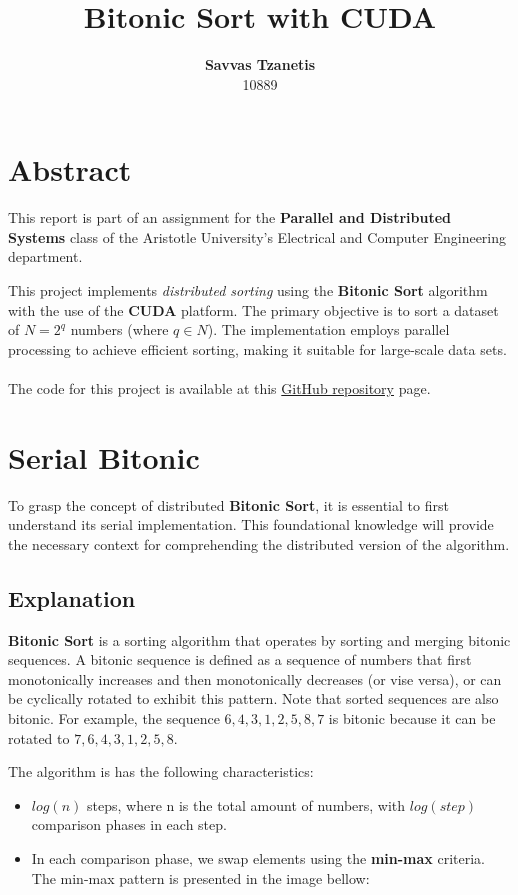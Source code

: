 \documentclass[12pt]{report}
\begin{document}
\title{\textbf{Bitonic Sort with CUDA}}
\author{\textbf{Savvas Tzanetis} \\ 10889}
\maketitle

\tableofcontents

\chapter{Abstract}
This report is part of an assignment for the \textbf{Parallel and Distributed Systems} class of the
Aristotle University's Electrical and Computer Engineering department. 

This project implements \textit{distributed sorting} using the \textbf{Bitonic Sort} algorithm with the use of the \textbf{CUDA} platform. The primary objective is to sort a dataset of $N = 2^q$ numbers (where $q \in N$). The implementation employs parallel processing to achieve efficient sorting, making it suitable for large-scale data sets.\\ \\
The code for this project is available at this \textcolor{blue}{\href{https://github.com/stzanetis/BitonicSortCUDA}{GitHub repository}} page.

\chapter{Serial Bitonic}
    To grasp the concept of distributed \textbf{Bitonic Sort}, it is essential to first understand its serial implementation. This foundational knowledge will provide the necessary context for comprehending the distributed version of the algorithm.

\section{Explanation}
    \textbf{Bitonic Sort} is a sorting algorithm that operates by sorting and merging bitonic sequences. A bitonic sequence is defined as a sequence of numbers that first monotonically increases and then monotonically decreases (or vise versa), or can be cyclically rotated to exhibit this pattern. Note that sorted sequences are also bitonic. For example, the sequence $6, 4, 3, 1, 2, 5, 8, 7$ is bitonic because it can be rotated to $7, 6, 4, 3, 1, 2, 5, 8$. 

    The algorithm is has the following characteristics:
    \begin{itemize}
        \item $log(n)$ steps, where n is the total amount of numbers, with $log(step)$ comparison phases in each step.
        \item In each comparison phase, we swap elements using the \textbf{min-max} criteria. The min-max pattern is presented in the image bellow:
    \end{itemize}
\end{document}
